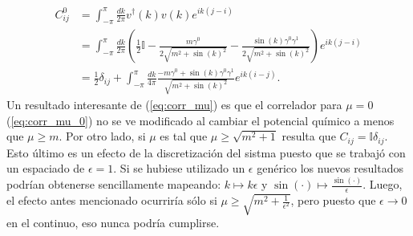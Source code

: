 \begin{equation}
\begin{split}
C_{ij}^0&=\int_{-\pi}^{\pi} \frac{dk}{2\pi} v^{\dag}(k)v(k)e^{ik(j-i)}\\
&=\int_{-\pi}^{\pi} \frac{dk}{2\pi}\left(\frac{1}{2}\mathbb{I}-\frac{m\gamma^0}{2\sqrt{m^2+\sin(k)^2}}-\frac{\sin(k)\gamma^0\gamma^1}{2\sqrt{m^2+\sin(k)^2}} \right)e^{ik(j-i)}\\
&=\frac{1}{2}\delta_{ij}+\int_{-\pi}^{\pi} \frac{dk}{4\pi}\frac{-m\gamma^0+\sin(k)\gamma^0\gamma^1}{\sqrt{m^2+\sin(k)^2}}e^{ik(i-j)}.
\end{split}
\label{eq:corr_mu_0}
\end{equation}
Un resultado interesante de (\ref{eq:corr_mu}) es que el correlador para $\mu=0$ (\ref{eq:corr_mu_0}) no se ve modificado al cambiar el potencial químico a menos que $\mu \geq m$. Por otro lado, si $\mu$ es tal que $\mu\geq \sqrt{m^2+1}$ resulta que $C_{ij}=\mathbb{I}\delta_{ij}$. Esto último es un efecto de la discretización del sistma puesto que se trabajó con un espaciado de $\epsilon=1$. Si se hubiese utilizado un $\epsilon$ genérico los nuevos resultados podrían obtenerse sencillamente mapeando: $k \mapsto k\epsilon$ y $\sin(\cdot)\mapsto \frac{\sin(\cdot)}{\epsilon}$. Luego, el efecto antes mencionado ocurriría sólo si $\mu \geq \sqrt{m^2+\frac{1}{\epsilon^2}}$, pero puesto que $\epsilon \rightarrow 0$ en el continuo, eso nunca podría cumplirse.\\


